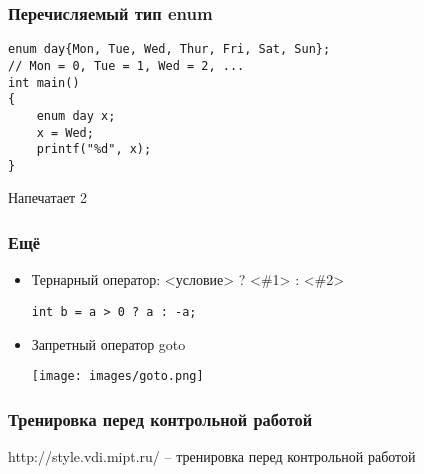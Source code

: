 \documentclass[12pt,pdf,hyperref={unicode}]{beamer}
\begin{document}
\begin{frame}[fragile]
\frametitle{Перечисляемый тип enum} 
\begin{lstlisting}
enum day{Mon, Tue, Wed, Thur, Fri, Sat, Sun};
// Mon = 0, Tue = 1, Wed = 2, ...
int main()
{
    enum day x;
    x = Wed;
    printf("%d", x);
} 
\end{lstlisting}
Напечатает 2
\end{frame}

\begin{frame}[fragile]
\frametitle{Ещё} 
\begin{itemize}
\item Тернарный оператор: <условие> ? <\#1> : <\#2>\\
\begin{lstlisting}
int b = a > 0 ? a : -a;
\end{lstlisting}
\item Запретный оператор goto \\
\begin{center}
\texttt{[image: images/goto.png]}
\end{center}
\end{itemize}
\end{frame}



\begin{frame}[fragile]
\frametitle{Тренировка перед контрольной работой} 
http://style.vdi.mipt.ru/  -- тренировка перед контрольной работой
\end{frame}
\end{document}
